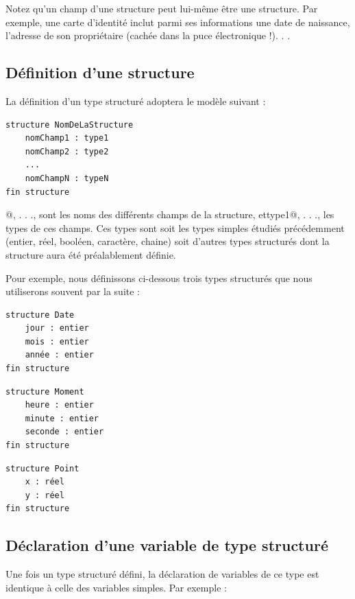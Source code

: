\documentclass[11pt,a4paper]{article}
\begin{document}
        Notez qu'un champ d'une structure peut lui-m\^eme \^etre une structure. Par exemple, une
        carte d'identit\'e inclut parmi ses informations une date de naissance, l'adresse de son
        propri\'etaire (cach\'ee dans la puce \'electronique !). . .
      
            \par
        \subsection{D\'efinition d'une structure}
		    La d\'efinition d'un type structur\'e adoptera le mod\`ele suivant :
      
            \par
        \begin{verbatim}
structure NomDeLaStructure
    nomChamp1 : type1
    nomChamp2 : type2
    ...
    nomChampN : typeN
fin structure
      \end{verbatim}@, . . ., \verb@nomChampN@ 
        sont les noms des diff\'erents champs de la structure, et\verb@ type1@,
        . . ., \verb@typeN@ les types de ces champs. 
        Ces types sont soit les types \guillemotleft  simples \guillemotright  \'etudi\'es pr\'ec\'edemment 
        (entier, r\'eel, bool\'een, caract\`ere, chaine) soit d'autres types structur\'es dont la
        structure aura \'et\'e pr\'ealablement d\'efinie.
      
            \par
        
        Pour exemple, nous d\'efinissons ci-dessous trois types structur\'es que nous utiliserons souvent par la suite :
      
            \par
        \begin{verbatim}
structure Date
    jour : entier
    mois : entier
    année : entier
fin structure
      \end{verbatim}\begin{verbatim}
structure Moment
    heure : entier
    minute : entier
    seconde : entier
fin structure
      \end{verbatim}\begin{verbatim}
structure Point
    x : réel
    y : réel
fin structure
      \end{verbatim}\subsection{D\'eclaration d'une variable de type structur\'e}
		    Une fois un type structur\'e d\'efini, la d\'eclaration de variables de ce type est identique \`a celle des variables simples. Par exemple :
      
\end{document}
